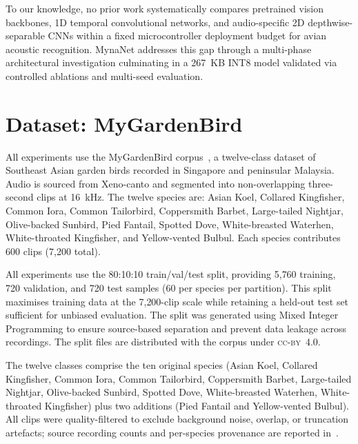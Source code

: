 \documentclass[final,5p,times,twocolumn,nolinenum]{elsarticle}
\begin{document}
To our knowledge, no prior work systematically compares pretrained vision backbones, 1D temporal convolutional networks, and audio-specific 2D depthwise-separable CNNs within a fixed microcontroller deployment budget for avian acoustic recognition. MynaNet addresses this gap through a multi-phase architectural investigation culminating in a 267~KB INT8 model validated via controlled ablations and multi-seed evaluation.

\section{Dataset: MyGardenBird}
\label{sec:dataset}

All experiments use the MyGardenBird corpus~\cite{zabidi2026seabird}, a
twelve-class dataset of Southeast Asian garden birds recorded in Singapore and
peninsular Malaysia. Audio is sourced from Xeno-canto and segmented into
non-overlapping three-second clips at \SI{16}{kHz}. The twelve species are:
Asian Koel, Collared Kingfisher, Common Iora, Common Tailorbird, Coppersmith
Barbet, Large-tailed Nightjar, Olive-backed Sunbird, Pied Fantail, Spotted Dove,
White-breasted Waterhen, White-throated Kingfisher, and Yellow-vented Bulbul.
Each species contributes 600 clips (7{,}200 total).

All experiments use the 80:10:10 train/val/test split, providing
5{,}760 training, 720 validation, and 720 test samples (60 per species
per partition). This split maximises training data at the 7{,}200-clip
scale while retaining a held-out test set sufficient for unbiased
evaluation. The split was generated using Mixed Integer Programming to
ensure source-based separation and prevent data leakage across recordings.
The split files are distributed with the corpus under \textsc{cc-by}~4.0.

The twelve classes comprise the ten original species (Asian Koel,
Collared Kingfisher, Common Iora, Common Tailorbird, Coppersmith Barbet,
Large-tailed Nightjar, Olive-backed Sunbird, Spotted Dove,
White-breasted Waterhen, White-throated Kingfisher) plus two additions
(Pied Fantail and Yellow-vented Bulbul). All clips were quality-filtered to
exclude background noise, overlap, or truncation artefacts; source recording
counts and per-species provenance are reported in~\cite{zabidi2026seabird}.

\end{document}
